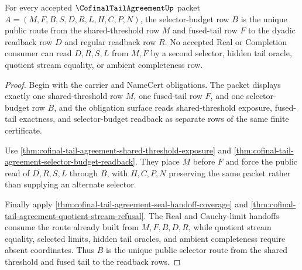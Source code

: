 \begin{theorem}
\label{thm:cofinal-tail-agreement-eventual-selector-exactness}
For every accepted $\CofinalTailAgreementUp$ packet $A=(M,F,B,S,D,R,L,H,C,P,N)$, the selector-budget row $B$ is the unique public route from the shared-threshold row $M$ and fused-tail row $F$ to the dyadic readback row $D$ and regular readback row $R$. No accepted Real or Completion consumer can read $D,R,S,L$ from $M,F$ by a second selector, hidden tail oracle, quotient stream equality, or ambient completeness row.
\end{theorem}
\begin{proof}
Begin with the carrier and NameCert obligations. The packet displays exactly one shared-threshold row $M$, one fused-tail row $F$, and one selector-budget row $B$, and the obligation surface reads shared-threshold exposure, fused-tail exactness, and selector-budget readback as separate rows of the same finite certificate.

Use \autoref{thm:cofinal-tail-agreement-shared-threshold-exposure} and \autoref{thm:cofinal-tail-agreement-selector-budget-readback}. They place $M$ before $F$ and force the public read of $D,R,S,L$ through $B$, with $H,C,P,N$ preserving the same packet rather than supplying an alternate selector.

Finally apply \autoref{thm:cofinal-tail-agreement-seal-handoff-coverage} and \autoref{thm:cofinal-tail-agreement-quotient-stream-refusal}. The Real and Cauchy-limit handoffs consume the route already built from $M,F,B,D,R$, while quotient stream equality, selected limits, hidden tail oracles, and ambient completeness require absent coordinates. Thus $B$ is the unique public selector route from the shared threshold and fused tail to the readback rows.
\end{proof}

